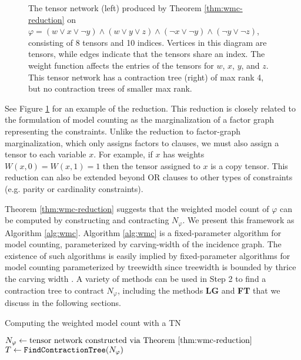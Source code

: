 \begin{figure}[t]
	\centering
	
	\hspace{1cm}
	
	\caption{\label{fig:wmc-example} The tensor network (left) produced by Theorem \ref{thm:wmc-reduction} on $\varphi = (w \lor x \lor \neg y) \land (w \lor y \lor z) \land (\neg x \lor \neg y) \land (\neg y \lor \neg z)$, consisting of 8 tensors and 10 indices. Vertices in this diagram are tensors, while edges indicate that the tensors share an index. The weight function affects the entries of the tensors for $w$, $x$, $y$, and $z$. This tensor network has a contraction tree (right) of max rank 4, but no contraction trees of smaller max rank.}
\end{figure}

See Figure \ref{fig:wmc-example} for an example of the reduction. This reduction is closely related to the formulation of model counting as the marginalization of a factor graph representing the constraints. Unlike the reduction to factor-graph marginalization, which only assigns factors to clauses, we must also assign a tensor to each variable $x$. For example, if $x$ has weights $W(x, 0) = W(x,1) = 1$ then the tensor assigned to $x$ is a copy tensor. This reduction can also be extended beyond OR clauses to other types of constraints (e.g. parity or cardinality constraints). 

Theorem \ref{thm:wmc-reduction} suggests that the weighted model count of $\varphi$ can be computed by constructing and contracting $N_\varphi$. We present this framework as Algorithm \ref{alg:wmc}. Algorithm \ref{alg:wmc} is a fixed-parameter algorithm for model counting, parameterized by carving-width of the incidence graph. The existence of such algorithms is easily implied by fixed-parameter algorithms for model counting parameterized by treewidth \cite{FMR08,SS10} since treewidth is bounded by thrice the carving width \cite{sasak10}. A variety of methods can be used in Step 2 to find a contraction tree to contract $N_\varphi$, including the methods \textbf{LG} and \textbf{FT} that we discuss in the following sections.

\begin{algorithm*}[t]
    \label{alg:wmc}
    \caption{Computing the weighted model count with a TN}
    \DontPrintSemicolon
    $N_\varphi \gets \text{tensor network constructed via Theorem \ref{thm:wmc-reduction}}$\;
    $T \gets \texttt{\upshape FindContractionTree}(N_\varphi)$ 
\end{algorithm*}



